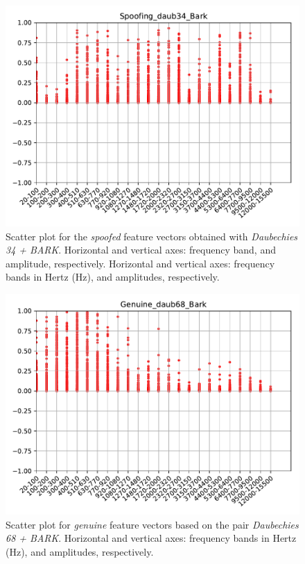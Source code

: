 		\begin{figure}[H]
			\centering
			\includegraphics[scale=.7]{images/results/barkVersusMel/Spoofing_daub34_Bark.pdf}
			\caption{Scatter plot for the \textit{spoofed} feature vectors obtained with \textit{Daubechies 34 + BARK}. Horizontal and vertical axes: frequency band, and amplitude, respectively. Horizontal and vertical axes: frequency bands in Hertz (Hz), and amplitudes, respectively.}
			\label{fig:spoofingdaub34bark}
		\end{figure}
		\begin{figure}[H]
			\centering
			\includegraphics[scale=.7]{images/results/barkVersusMel/Genuine_daub68_Bark.pdf}
			\caption{Scatter plot for \textit{genuine} feature vectors based on the pair \textit{Daubechies 68 + BARK}. Horizontal and vertical axes: frequency bands in Hertz (Hz), and amplitudes, respectively.}
			\label{fig:livedaub68bark}
		\end{figure}
